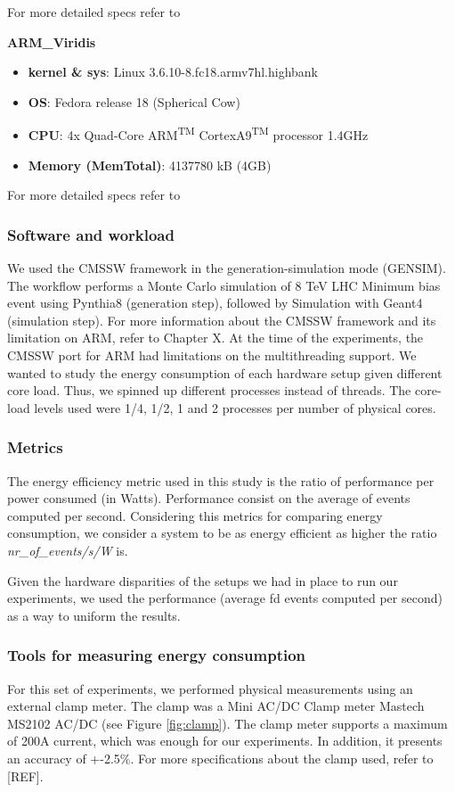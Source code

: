 For more detailed specs refer to \cite{quad_specs}

\vspace{10mm}
\textbf{ARM\_Viridis}
\begin{itemize}
  \item[] \textbf{kernel \& sys}:  Linux  3.6.10-8.fc18.armv7hl.highbank
  \item[] \textbf{OS}: Fedora release 18 (Spherical Cow)
  \item[] \textbf{CPU}:    4x Quad-Core ARM\textsuperscript{TM} CortexA9\textsuperscript{TM} processor \@1.4GHz
  \item[] \textbf{Memory  (MemTotal)}:        4137780 kB (4GB) 
\end{itemize}

For more detailed specs refer to \cite{viridis_specs}


\subsubsection*{Software and workload}
We used the CMSSW framework in the generation-simulation mode (GEN\-SIM). The workflow performs a Monte Carlo simulation of 8 TeV LHC Minimum bias event using Pynthia8 (generation step), followed by Simulation with Geant4 (simulation step). For more information about the CMSSW framework and its limitation on ARM, refer to Chapter X.
At the time of the experiments, the CMSSW port for ARM had limitations on the multithreading support. We wanted to study the energy consumption of each hardware setup given different core load. Thus, we spinned up different processes instead of threads. The core-load levels used were 1/4, 1/2, 1 and 2 processes per number of physical cores. 

\subsubsection*{Metrics}
The energy efficiency metric used in this study is the ratio of performance per power consumed (in Watts). Performance consist on the average of events computed per second. Considering this metrics for comparing energy consumption, we consider a system to be as energy efficient as higher the ratio \textit{nr\_of\_events/s/W} is.

Given the hardware disparities of the setups we had in place to run our experiments, we used the performance (average fd events computed per second) as a way to uniform the results.

\subsubsection*{Tools for measuring energy consumption}
For this set of experiments, we performed physical measurements using an external clamp meter. The clamp was a Mini AC/DC Clamp meter
Mastech MS2102 AC/DC (see Figure \ref{fig:clamp}). The clamp meter supports a maximum of 200A current, which was enough for our experiments. In addition, it presents an accuracy of +-2.5\%. For more specifications about the clamp used, refer to [REF].

